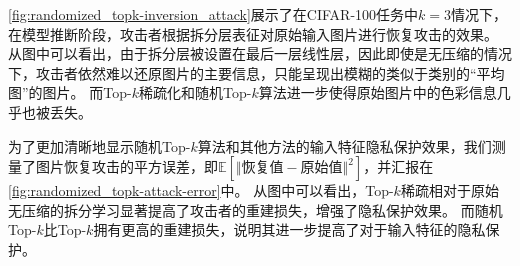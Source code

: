 \autoref{fig:randomized_topk-inversion_attack}展示了在CIFAR-100任务中$k=3$情况下，在模型推断阶段，攻击者根据拆分层表征对原始输入图片进行恢复攻击的效果。
从图中可以看出，由于拆分层被设置在最后一层线性层，因此即使是无压缩的情况下，攻击者依然难以还原图片的主要信息，只能呈现出模糊的类似于类别的“平均图”的图片。
%
而Top-$k$稀疏化和随机Top-$k$算法进一步使得原始图片中的色彩信息几乎也被丢失。
%

为了更加清晰地显示随机Top-$k$算法和其他方法的输入特征隐私保护效果，我们测量了图片恢复攻击的平方误差，即$\mathbb E\left[ \Vert \text{恢复值} - \text{原始值} \Vert^2 \right]$，并汇报在\autoref{fig:randomized_topk-attack-error}中。
%
从图中可以看出，Top-$k$稀疏相对于原始无压缩的拆分学习显著提高了攻击者的重建损失，增强了隐私保护效果。
而随机Top-$k$比Top-$k$拥有更高的重建损失，说明其进一步提高了对于输入特征的隐私保护。


